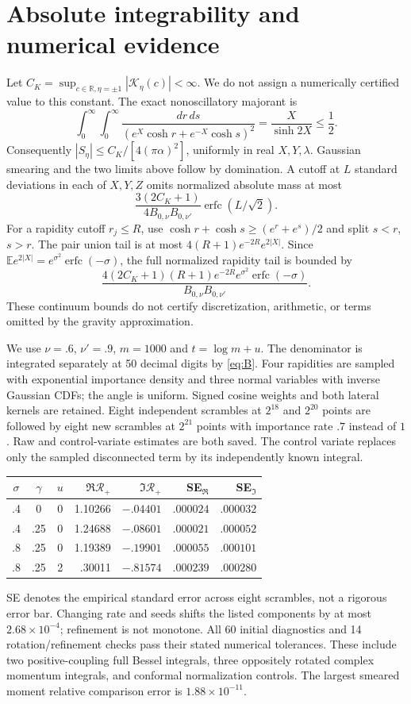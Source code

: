 \documentclass[11pt,a4paper]{article}
\newcommand{\E}{\mathbb E}
\newcommand{\K}{\mathcal K}
\newcommand{\R}{\mathcal R}
\begin{document}
\newpage
\section{Absolute integrability and numerical evidence}
Let $C_K=\sup_{c\in\mathbb R,\eta=\pm1}|\K_\eta(c)|<\infty$.
We do not assign a numerically certified value to this constant.
The exact nonoscillatory majorant is
\[
 \int_0^\infty\!\int_0^\infty
 \frac{dr\,ds}{(e^X\cosh r+e^{-X}\cosh s)^2}
 =\frac{X}{\sinh2X}\leq\frac12.
\]
Consequently $|S_\eta|\leq C_K/[4(\pi\alpha)^2]$, uniformly in
real $X,Y,\lambda$. Gaussian smearing and the two limits above follow
by domination. A cutoff at $L$ standard deviations in each of
$X,Y,Z$ omits normalized absolute mass at most
\[
 \frac{3(2C_K+1)}{4B_{0,\nu}B_{0,\nu'}}\operatorname{erfc}(L/\sqrt2).
\]
For a rapidity cutoff $r_j\leq R$, use
$\cosh r+\cosh s\geq(e^r+e^s)/2$ and split $s<r$, $s>r$.
The pair union tail is at most $4(R+1)e^{-2R}e^{2|X|}$.
Since $\E e^{2|X|}=e^{\sigma^2}\operatorname{erfc}(-\sigma)$,
the full normalized rapidity tail is bounded by
\[
 \frac{4(2C_K+1)(R+1)e^{-2R}e^{\sigma^2}
 \operatorname{erfc}(-\sigma)}{B_{0,\nu}B_{0,\nu'}}.
\]
These continuum bounds do not certify discretization, arithmetic,
or terms omitted by the gravity approximation.

We use $\nu=.6$, $\nu'=.9$, $m=1000$ and $t=\log m+u$.
The denominator is integrated separately at 50 decimal digits by
\eqref{eq:B}. Four rapidities are sampled with exponential importance
density and three normal variables with inverse Gaussian CDFs; the
angle is uniform. Signed cosine weights and both lateral kernels
are retained. Eight independent scrambles at $2^{18}$ and $2^{20}$
points are followed by eight new scrambles at $2^{21}$ points with
importance rate $.7$ instead of $1$. Raw and control-variate estimates
are both saved. The control variate replaces only the sampled
disconnected term by its independently known integral.

\begin{center}\begin{tabular}{ccc rr rr}
\toprule
$\sigma$&$\gamma$&$u$&$\Re\R_+$&$\Im\R_+$&SE$_{\Re}$&SE$_{\Im}$\\
\midrule
.4&0&0&1.10266&$-.04401$&$.000024$&$.000032$\\
.4&.25&0&1.24688&$-.08601$&$.000021$&$.000052$\\
.8&.25&0&1.19389&$-.19901$&$.000055$&$.000101$\\
.8&.25&2&.30011&$-.81574$&$.000239$&$.000280$\\
\bottomrule
\end{tabular}\end{center}
SE denotes the empirical standard error across eight scrambles,
not a rigorous error bar. Changing rate and seeds shifts the listed
components by at most $2.68\times10^{-4}$; refinement is not monotone.
All 60 initial diagnostics and 14 rotation/refinement checks pass
their stated numerical tolerances. These include two positive-coupling
full Bessel integrals, three oppositely rotated complex momentum
integrals, and conformal normalization controls. The largest smeared
moment relative comparison error is $1.88\times10^{-11}$.
\end{document}
